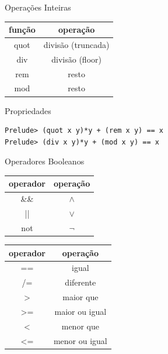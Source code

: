 \documentclass{beamer}
\begin{document}
	\begin{frame}[fragile]{Operações Inteiras}
	
	\begin{table}[h]
		\begin{tabular}{c | c}
			\hline
			função & operação\\
			\hline
			quot & divisão (truncada) \\
			div & divisão (floor) \\
			rem & resto \\
			mod & resto \\
			\hline
		\end{tabular}
	\end{table}
	
	\begin{block}{Propriedades}
		\begin{lstlisting}
Prelude> (quot x y)*y + (rem x y) == x  
Prelude> (div x y)*y + (mod x y) == x
		\end{lstlisting}
	 \end{block}

	\end{frame}
	
	\begin{frame}{Operadores Booleanos}
	 
	 \begin{table}[h]
	  \begin{tabular}{c | c}
	  \hline
	   operador & operação\\
	   \hline
	   \&\& & $\land$ \\
	   || & $\lor$ \\
	   not & $\lnot$ \\
	   \hline
	  \end{tabular}
	 \end{table}
	 
	 \begin{table}[h]
	  \begin{tabular}{c | c}
	  \hline
	   operador & operação\\
	   \hline
	   == & igual \\
	   /= & diferente \\
	   > & maior que \\
	   >= & maior ou igual \\
	   < & menor que \\
	   <= & menor ou igual \\
	   \hline
	  \end{tabular}
	 \end{table} 
	\end{frame}
	
\end{document}
